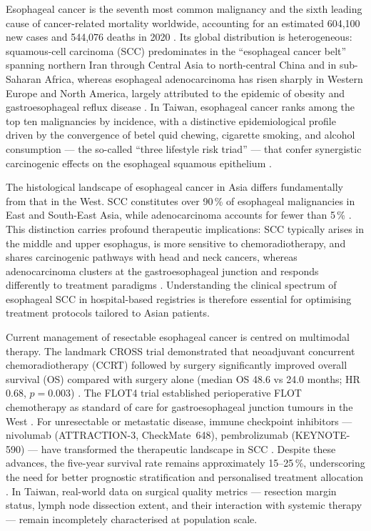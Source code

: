 \documentclass[12pt,a4paper]{article}
\begin{document}
Esophageal cancer is the seventh most common malignancy and the sixth
leading cause of cancer-related mortality worldwide, accounting for an
estimated 604,100 new cases and 544,076 deaths in 2020 \cite{Sung2021}.
Its global distribution is heterogeneous: squamous-cell carcinoma (SCC)
predominates in the ``esophageal cancer belt'' spanning northern Iran
through Central Asia to north-central China and in sub-Saharan Africa,
whereas esophageal adenocarcinoma has risen sharply in Western Europe
and North America, largely attributed to the epidemic of obesity and
gastroesophageal reflux disease \cite{Arnold2015, Lagergren2017}. In
Taiwan, esophageal cancer ranks among the top ten malignancies by
incidence, with a distinctive epidemiological profile driven by the
convergence of betel quid chewing, cigarette smoking, and alcohol
consumption --- the so-called ``three lifestyle risk triad'' --- that
confer synergistic carcinogenic effects on the esophageal squamous
epithelium \cite{Lee2005, Huang2018}.

The histological landscape of esophageal cancer in Asia differs
fundamentally from that in the West. SCC constitutes over 90\,\% of
esophageal malignancies in East and South-East Asia, while adenocarcinoma
accounts for fewer than 5\,\% \cite{Arnold2015}. This distinction carries
profound therapeutic implications: SCC typically arises in the middle and
upper esophagus, is more sensitive to chemoradiotherapy, and shares
carcinogenic pathways with head and neck cancers, whereas adenocarcinoma
clusters at the gastroesophageal junction and responds differently to
treatment paradigms \cite{Rustgi2014}. Understanding the clinical spectrum
of esophageal SCC in hospital-based registries is therefore essential for
optimising treatment protocols tailored to Asian patients.

Current management of resectable esophageal cancer is centred on
multimodal therapy. The landmark CROSS trial demonstrated that neoadjuvant
concurrent chemoradiotherapy (CCRT) followed by surgery significantly
improved overall survival (OS) compared with surgery alone (median OS 48.6
vs 24.0 months; HR 0.68, $p = 0.003$) \cite{vanHagen2012}. The FLOT4
trial established perioperative FLOT chemotherapy as standard of care for
gastroesophageal junction tumours in the West \cite{AlBatran2019}. For
unresectable or metastatic disease, immune checkpoint inhibitors ---
nivolumab (ATTRACTION-3, CheckMate~648), pembrolizumab (KEYNOTE-590) ---
have transformed the therapeutic landscape in SCC \cite{Kato2019,
Sun2021}. Despite these advances, the five-year survival rate remains
approximately 15--25\,\%, underscoring the need for better prognostic
stratification and personalised treatment allocation \cite{Kelly2021}. In
Taiwan, real-world data on surgical quality metrics --- resection margin
status, lymph node dissection extent, and their interaction with systemic
therapy --- remain incompletely characterised at population scale.
\end{document}
